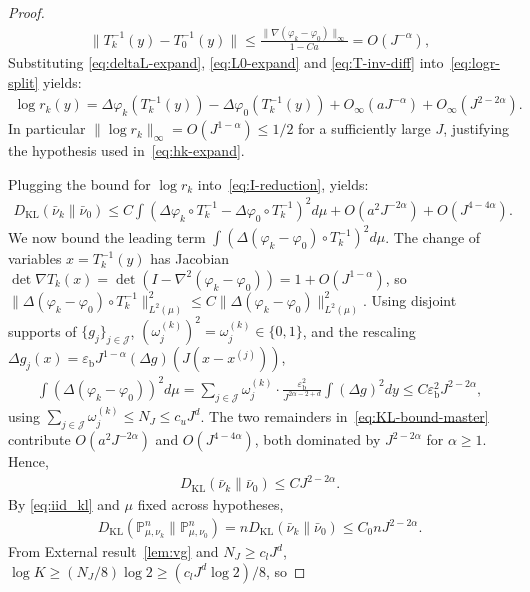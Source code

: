\documentclass[11pt,reqno]{amsart}
\theoremstyle{definition}
\newcommand{\KL}{\mathrm{KL}}
\newcommand{\mJ}{\mathcal{J}}
\begin{document}
\begin{proof}
\begin{align}
    \|T_k^{-1}(y)-T_0^{-1}(y)\|  \le  \frac{\|\nabla(\varphi_k-\varphi_0)\|_\infty}{1-Ca}  =  O(J^{-\alpha}),
\end{align}
Substituting \eqref{eq:deltaL-expand}, \eqref{eq:L0-expand} and \eqref{eq:T-inv-diff} into~\eqref{eq:logr-split} yields:
\begin{align}
    \log r_k(y)  =  \Delta \varphi_k(T_k^{-1}(y))-\Delta \varphi_0(T_k^{-1}(y))+O_\infty(a J^{-\alpha})+O_\infty(J^{2-2\alpha}).
\end{align}
In particular $\|\log r_k\|_\infty=O(J^{1-\alpha})\le 1/2$ for a sufficiently large $J$, justifying the hypothesis used in~\eqref{eq:hk-expand}.

Plugging the bound for $\log r_k$ into~\eqref{eq:I-reduction}, yields:
\begin{align}\label{eq:KL-bound-master}
D_\KL(\bar\nu_k\|\bar\nu_0)\le C \int(\Delta \varphi_k\circ T_k^{-1}-\Delta \varphi_0\circ T_k^{-1})^2 d\mu + O(a^2 J^{-2\alpha}) + O(J^{4-4\alpha}).
\end{align}
We now bound the leading term $\int(\Delta(\varphi_k-\varphi_0)\circ T_k^{-1})^2 d\mu$. The change of variables $x=T_k^{-1}(y)$ has Jacobian $\det \nabla T_k(x)=\det(I-\nabla^2(\varphi_k-\varphi_0))=1+O(J^{1-\alpha})$, so $\|\Delta(\varphi_k-\varphi_0)\circ T_k^{-1}\|_{L^2(\mu)}^2\le C\|\Delta(\varphi_k-\varphi_0)\|_{L^2(\mu)}^2$. Using disjoint supports of $\{g_j\}_{j\in\mJ}$, $(\omega_j^{(k)})^2=\omega_j^{(k)}\in\{0,1\}$, and the rescaling $\Delta g_j(x)=\varepsilon_{\mathrm b} J^{1-\alpha}(\Delta g)(J(x-x^{(j)}))$,
\begin{align}
    \int(\Delta(\varphi_k-\varphi_0))^2 d\mu
     = \sum_{j\in\mJ}\omega_j^{(k)}\cdot\frac{\varepsilon_{\mathrm b}^2}{J^{2\alpha-2+d}} \int(\Delta g)^2 dy
     \le  C \varepsilon_{\mathrm b}^2 J^{2-2\alpha},
\end{align}
using $\sum_{j\in\mJ}\omega_j^{(k)}\le N_J\le c_u J^d$. The two remainders in~\eqref{eq:KL-bound-master} contribute $O(a^2 J^{-2\alpha})$ and $O(J^{4-4\alpha})$, both dominated by $J^{2-2\alpha}$ for $\alpha\ge 1$. Hence,
\begin{align}
    D_\KL(\bar\nu_k\|\bar\nu_0)  \le  C J^{2-2\alpha}.
\end{align}
By \eqref{eq:iid_kl} and $\mu$ fixed across hypotheses,
\begin{align}
    D_\KL(\mathbb P_{\mu,\nu_k}^n\|\mathbb P_{\mu,\nu_0}^n)
    = n D_\KL(\bar\nu_k\|\bar\nu_0)
    \le C_0 n J^{2-2\alpha}.
\end{align}
From External result~\ref{lem:vg} and $N_J\ge c_l J^d$, $\log K\ge (N_J/8)\log 2\ge (c_l J^d\log 2)/8$, so

\end{proof}
\end{document}
